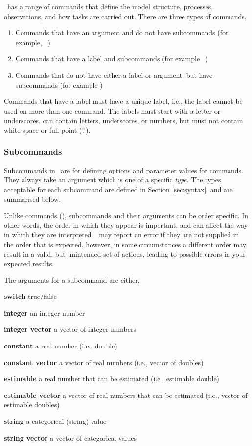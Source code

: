 \SPM\ has a range of commands that define the model structure, processes, observations, and how tasks are carried out. There are three types of commands, 

\begin{enumerate}
\item Commands that have an argument and do not have subcommands (for example, \ )
\item Commands that have a label and subcommands (for example \ )
\item Commands that do not have either a label or argument, but have subcommands (for example )
\end{enumerate}

Commands that have a label must have a unique label, i.e., the label cannot be used on more than one command. The labels must start with a letter or underscores, can contain letters, underscores, or numbers, but must not contain white-space or full-point ('.').

\subsubsection{Subcommands}

Subcommands in \SPM\ are for defining options and parameter values for commands. They always take an argument which is one of a specific \emph{type}. The types acceptable for each subcommand are defined in Section \ref{sec:syntax}, and are summarised below. 

Unlike commands (), subcommands and their arguments can be order specific. In other words, the order in which they appear is important, and can affect the way in which they are interpreted. \SPM\ may report an error if they are not supplied in the order that is expected, however, in some circumstances a different order may result in a valid, but unintended set of actions, leading to possible errors in your expected results.  

The arguments for a subcommand are either,

\begin{description}
\item \textbf{switch} true/false 
\item \textbf{integer} an integer number
\item \textbf{integer vector} a vector of integer numbers
\item \textbf{constant} a real number (i.e., double)
\item \textbf{constant vector} a vector of real numbers (i.e., vector of doubles)
\item \textbf{estimable} a real number that can be estimated (i.e., estimable double)
\item \textbf{estimable vector} a vector of real numbers that can be estimated (i.e., vector of estimable doubles)
\item \textbf{string} a categorical (string) value
\item \textbf{string vector} a vector of categorical values
\end{description}

